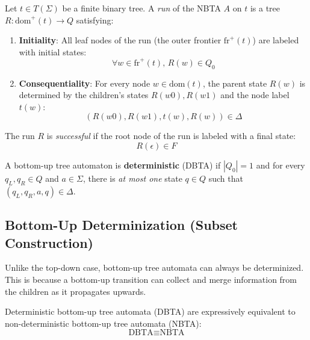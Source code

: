 \begin{definition}
Let $t \in T(\Sigma)$ be a finite binary tree. A \emph{run} of the NBTA $A$ on $t$ is a tree $R: \text{dom}^+(t) \to Q$ satisfying:
\begin{enumerate}
    \item \textbf{Initiality}: All leaf nodes of the run (the outer frontier $\text{fr}^+(t)$) are labeled with initial states:
    $$\forall w \in \text{fr}^+(t), \, R(w) \in Q_0$$
    \item \textbf{Consequentiality}: For every node $w \in \text{dom}(t)$, the parent state $R(w)$ is determined by the children's states $R(w0), R(w1)$ and the node label $t(w)$:
    $$(R(w0), R(w1), t(w), R(w)) \in \Delta$$
\end{enumerate}
The run $R$ is \emph{successful} if the root node of the run is labeled with a final state:
$$R(\epsilon) \in F$$
\end{definition}

A bottom-up tree automaton is \textbf{deterministic} (DBTA) if $|Q_0| = 1$ and for every $q_L, q_R \in Q$ and $a \in \Sigma$, there is \emph{at most one} state $q \in Q$ such that $(q_L, q_R, a, q) \in \Delta$.

\subsection{Bottom-Up Determinization (Subset Construction)}
Unlike the top-down case, bottom-up tree automata can always be determinized. This is because a bottom-up transition can collect and merge information from the children as it propagates upwards.

\begin{theorem}\label{thm:bottom-up-determinization}
Deterministic bottom-up tree automata (DBTA) are expressively equivalent to non-deterministic bottom-up tree automata (NBTA):
$$\text{DBTA} \equiv \text{NBTA}$$
\end{theorem}

